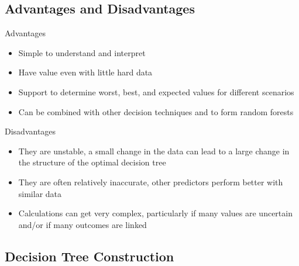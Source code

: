 \subsection{Advantages and Disadvantages}

\begin{concept}{Advantages}
\begin{itemize}
    \item Simple to understand and interpret
    \item Have value even with little hard data
    \item Support to determine worst, best, and expected values for different scenarios
    \item Can be combined with other decision techniques and to form random forests
\end{itemize}
\end{concept}

\begin{concept}{Disadvantages}
\begin{itemize}
    \item They are unstable, a small change in the data can lead to a large change in the structure of the optimal decision tree
    \item They are often relatively inaccurate, other predictors perform better with similar data
    \item Calculations can get very complex, particularly if many values are uncertain and/or if many outcomes are linked
\end{itemize}
\end{concept}

\subsection{Decision Tree Construction}

